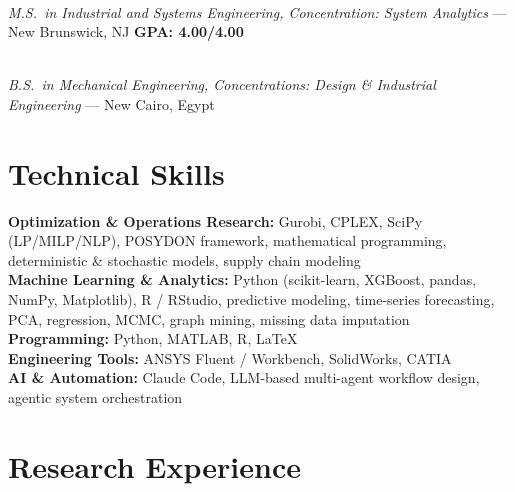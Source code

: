 \documentclass[10pt, letterpaper]{article}
\begin{document}
\\
\textit{M.S.\ in Industrial and Systems Engineering, Concentration: System Analytics} --- New Brunswick, NJ \quad
\textbf{GPA: 4.00/4.00}

\entrysep

\\
\textit{B.S.\ in Mechanical Engineering, Concentrations: Design \& Industrial Engineering} --- New Cairo, Egypt

\vspace{1pt}

\section{Technical Skills}

\noindent
\textbf{Optimization \& Operations Research:} Gurobi, CPLEX, SciPy (LP/MILP/NLP), POSYDON framework, mathematical programming, deterministic \& stochastic models, supply chain modeling\\[2.5pt]
\textbf{Machine Learning \& Analytics:} Python (scikit-learn, XGBoost, pandas, NumPy, Matplotlib), R / RStudio, predictive modeling, time-series forecasting, PCA, regression, MCMC, graph mining, missing data imputation\\[2.5pt]
\textbf{Programming:} Python, MATLAB, R, LaTeX\\[2.5pt]
\textbf{Engineering Tools:} ANSYS Fluent / Workbench, SolidWorks, CATIA\\[2.5pt]
\textbf{AI \& Automation:} Claude Code, LLM-based multi-agent workflow design, agentic system orchestration

\vspace{1pt}

\section{Research Experience}
\end{document}
